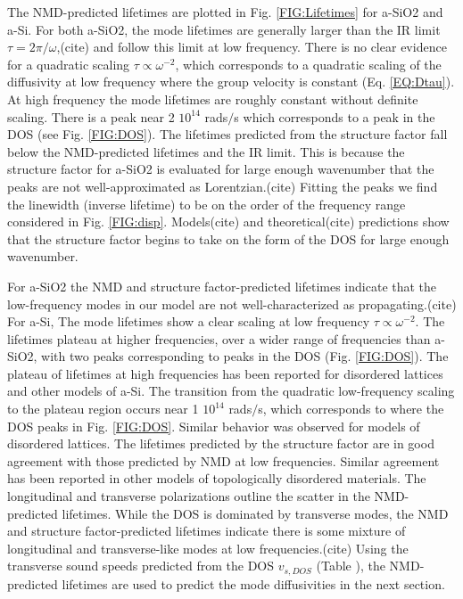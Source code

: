 \documentclass[aps,prb,onecolumn,preprint,superscriptaddress,footinbib,amsmath,amssymb,floatfix]{revtex4}
\begin{document}
The NMD-predicted lifetimes are plotted in Fig. \ref{FIG:Lifetimes} 
for a-SiO2 and a-Si. 
For both a-SiO2, the mode lifetimes are generally larger than 
the IR limit $\tau = 2\pi/\omega$,(cite) and follow 
this limit at low frequency. There is no clear evidence for a
quadratic scaling $\tau\propto\omega^{-2}$, which 
corresponds to a quadratic scaling of the diffusivity at low 
frequency where the group velocity is constant 
(Eq. \eqref{EQ:Dtau}). 
At high frequency the mode lifetimes are roughly constant 
without definite scaling. There is a peak near 
2 $10^{14}$ rads$/$s which corresponds to a peak in the DOS 
(see Fig. \ref{FIG:DOS}).  The lifetimes predicted from the 
structure factor fall below the NMD-predicted lifetimes 
and the IR limit. This is because the structure factor for 
a-SiO2 is evaluated for large enough wavenumber that the 
peaks are not well-approximated as Lorentzian.(cite) Fitting 
the peaks we find the linewidth (inverse lifetime) 
to be on the order of the frequency range considered in 
Fig. \ref{FIG:disp}. 
Models(cite) and theoretical(cite) predictions show that the 
structure factor begins to take on the form of the DOS 
for large enough wavenumber.
\cite{martin-mayor_dynamical_2001,baldi_thermal_2008} 

For a-SiO2 the NMD and 
structure factor-predicted lifetimes indicate that the low-frequency modes 
in our model are not well-characterized as propagating.(cite)  
For a-Si, 
The mode lifetimes show a clear scaling at low frequency 
$\tau\propto\omega^{-2}$. The lifetimes plateau at higher frequencies,
over a wider range of frequencies than a-SiO2, with two peaks 
corresponding to peaks in the DOS (Fig. \ref{FIG:DOS}). The plateau of 
lifetimes at high frequencies has been 
reported for disordered lattices
\cite{sheng_heat_1991,larkin_predicting_2013} and 
other models of a-Si.\cite{he_heat_2011} 
The transition from the quadratic low-frequency scaling to 
the plateau region occurs near 
1 $10^{14}$ rads$/$s, which corresponds to where the DOS peaks in Fig. 
\ref{FIG:DOS}. 
Similar behavior was observed for models of disordered lattices.
\cite{larkin_predicting_2013} The lifetimes predicted by the 
structure factor are in good agreement with those predicted by NMD 
at low frequencies. Similar agreement has been reported in other 
models of topologically disordered materials.
\cite{mazzacurati_low-frequency_1996} 
The longitudinal and transverse polarizations 
outline the scatter in the NMD-predicted lifetimes. While the DOS is 
dominated by transverse modes, the NMD and 
structure factor-predicted lifetimes indicate there 
is some mixture of longitudinal and transverse-like modes at 
low frequencies.(cite) Using the transverse sound speeds predicted 
from the DOS $v_{s,DOS}$ (Table ), the NMD-predicted lifetimes are 
used to predict the mode diffusivities in the next section. 
\end{document}
